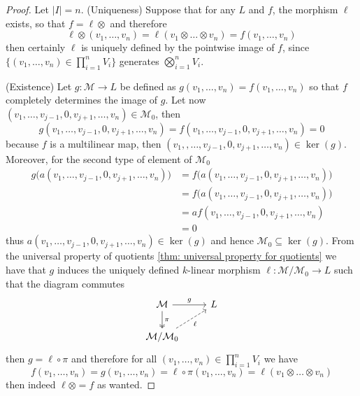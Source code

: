 \begin{proof}
  Let \(|I| = n\). (Uniqueness) Suppose that for any \(L\) and \(f\), the
  morphism \(\ell\) exists, so that \(f = \ell \otimes\) and therefore
  \[
    \ell \otimes (v_1, \dots, v_n) = \ell(v_1 \otimes \dots \otimes v_n)
    = f(v_1, \dots, v_n)
  \]
  then certainly \(\ell\) is uniquely defined by the pointwise image of \(f\),
  since \(\{(v_1, \dots, v_n) \in \prod_{i=1}^n V_i\}\) generates
  \(\bigotimes_{i=1}^n V_i\).

  (Existence) Let \(g : \mathcal M \to L\) be defined as \(g(v_1, \dots, v_n) =
  f(v_1, \dots, v_n)\) so that \(f\) completely determines the image of \(g\).
  Let now \((v_1, \dots, v_{j-1}, 0, v_{j+1}, \dots, v_n) \in \mathcal M_0\),
  then
  \[
    g(v_1, \dots, v_{j-1}, 0, v_{j+1}, \dots, v_n)
    = f(v_1, \dots, v_{j-1}, 0, v_{j+1}, \dots, v_n) = 0
  \]
  because \(f\) is a multilinear map, then \((v_1,, \dots, v_{j-1}, 0, v_{j+1},
  \dots, v_n) \in \ker(g)\). Moreover, for the second type of element of
  \(\mathcal M_0\)
  \begin{align*}
    g\big(a(v_1, \dots, v_{j-1}, 0, v_{j+1}, \dots, v_n)\big)
    &= f\big(a(v_1, \dots, v_{j-1}, 0, v_{j+1}, \dots, v_n)\big) \\
    &= f\big(a(v_1, \dots, v_{j-1}, 0, v_{j+1}, \dots, v_n)\big) \\
    &= a f(v_1, \dots, v_{j-1}, 0, v_{j+1}, \dots, v_n) \\
    &= 0
  \end{align*}
  thus \(a(v_1, \dots, v_{j-1}, 0, v_{j+1}, \dots, v_n) \in \ker(g)\) and
  hence \(\mathcal M_0 \subseteq \ker(g)\). From the universal property of
  quotients \cref{thm: universal property for quotients} we have that \(g\)
  induces the uniquely defined \(k\)-linear morphism \(\ell: \mathcal M /
  \mathcal M_0 \to L\) such that the diagram commutes
  \[
    \begin{tikzcd}
      \mathcal M
      \ar[d, two heads, "\pi"]
      \ar[r, "g"]
        &L \\
      \mathcal M / \mathcal M_0
      \ar[ur, swap, dashed, "\ell"]
        &
    \end{tikzcd}
  \]
  then \(g = \ell \circ \pi\) and therefore for all \((v_1, \dots, v_n) \in
  \prod_{i=1}^n V_i\) we have
  \[
    f(v_1, \dots, v_n)
    = g(v_1, \dots, v_n)
    = \ell \circ \pi (v_1, \dots, v_n)
    = \ell(v_1 \otimes \dots \otimes v_n)
  \]
  then indeed \(\ell \otimes = f\) as wanted.
\end{proof}


